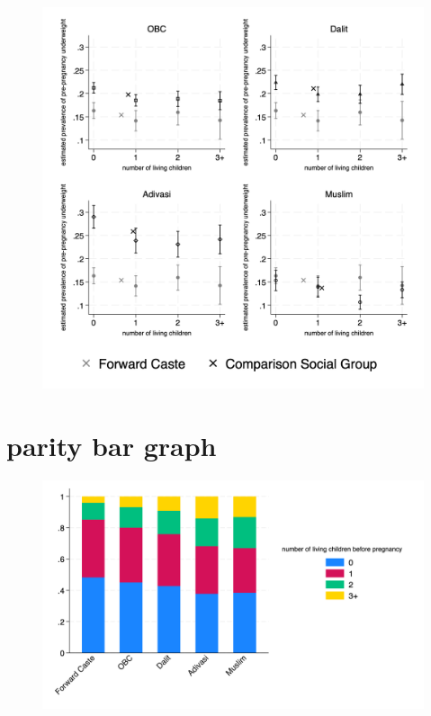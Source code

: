\documentclass{article}
\begin{document}
\begin{figure}[H]
    \centering
    \includegraphics[width=\textwidth]{figures/prepreg_underweight_combined.png}
\end{figure}

\section{parity bar graph}
\begin{figure}[H]
    \centering
    \includegraphics[width=\textwidth]{figures/stackedbar_parity_socialgroup.png}
\end{figure}
\end{document}
